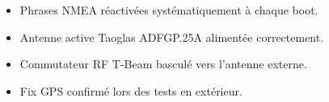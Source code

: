 \documentclass[12pt,a4paper]{article}
\begin{document}
\begin{okbox}[title=\'Etat actuel du syst\`eme]
\begin{itemize}
  \item[$\checkmark$] Phrases NMEA r\'eactiv\'ees syst\'ematiquement \`a chaque boot.
  \item[$\checkmark$] Antenne active Taoglas ADFGP.25A aliment\'ee correctement.
  \item[$\checkmark$] Commutateur RF T-Beam bascul\'e vers l'antenne externe.
  \item[$\checkmark$] Fix GPS confirm\'e lors des tests en ext\'erieur.
\end{itemize}
\end{okbox}
\end{document}
